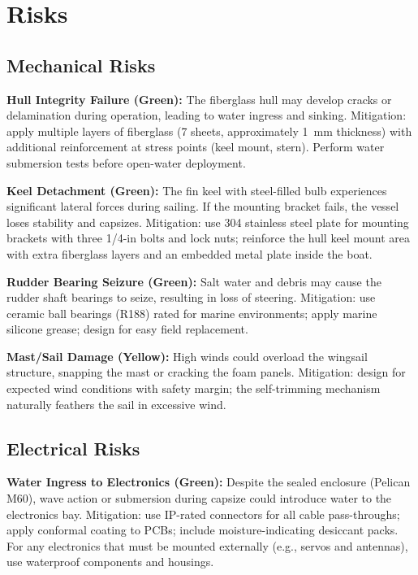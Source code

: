 
\section{Risks}
\label{sec:risks}


\subsection{Mechanical Risks}

\textbf{Hull Integrity Failure (Green):} The fiberglass hull may develop cracks or delamination during operation, leading to water ingress and sinking. Mitigation: apply multiple layers of fiberglass (7 sheets, approximately 1~mm thickness) with additional reinforcement at stress points (keel mount, stern). Perform water submersion tests before open-water deployment.

\textbf{Keel Detachment (Green):} The fin keel with steel-filled bulb experiences significant lateral forces during sailing. If the mounting bracket fails, the vessel loses stability and capsizes. Mitigation: use 304 stainless steel plate for mounting brackets with three 1/4-in bolts and lock nuts; reinforce the hull keel mount area with extra fiberglass layers and an embedded metal plate inside the boat.

\textbf{Rudder Bearing Seizure (Green):} Salt water and debris may cause the rudder shaft bearings to seize, resulting in loss of steering. Mitigation: use ceramic ball bearings (R188) rated for marine environments; apply marine silicone grease; design for easy field replacement.

\textbf{Mast/Sail Damage (Yellow):} High winds could overload the wingsail structure, snapping the mast or cracking the foam panels. Mitigation: design for expected wind conditions with safety margin; the self-trimming mechanism naturally feathers the sail in excessive wind.


\subsection{Electrical Risks}

\textbf{Water Ingress to Electronics (Green):} Despite the sealed enclosure (Pelican M60), wave action or submersion during capsize could introduce water to the electronics bay. Mitigation: use IP-rated connectors for all cable pass-throughs; apply conformal coating to PCBs; include moisture-indicating desiccant packs. For any electronics that must be mounted externally (e.g., servos and antennas), use waterproof components and housings.

